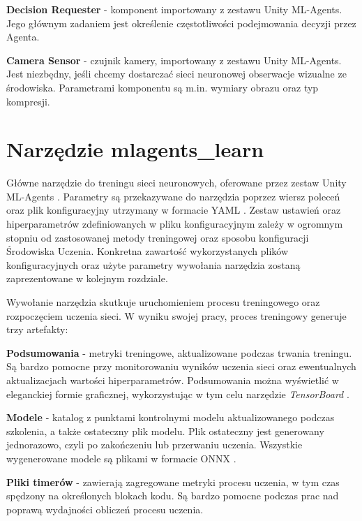 \begin{enumerate*}
\item \textbf{Decision Requester} - komponent importowany z zestawu Unity ML-Agents. Jego głównym zadaniem jest określenie częstotliwości podejmowania decyzji przez Agenta.
\item \textbf{Camera Sensor} - czujnik kamery, importowany z zestawu Unity ML-Agents. Jest niezbędny, jeśli chcemy dostarczać sieci neuronowej obserwacje wizualne ze środowiska. Parametrami komponentu są m.in. wymiary obrazu oraz typ kompresji.
\end{enumerate*}

\section{Narzędzie mlagents\_learn}
Główne narzędzie do treningu sieci neuronowych, oferowane przez zestaw Unity ML-Agents \cite{unitymla:trainingMlAgents}. Parametry są przekazywane do narzędzia poprzez wiersz poleceń oraz plik konfiguracyjny utrzymany w formacie YAML \cite{unitymla:configFile}. Zestaw ustawień oraz hiperparametrów zdefiniowanych w pliku konfiguracyjnym zależy w ogromnym stopniu od zastosowanej metody treningowej oraz sposobu konfiguracji Środowiska Uczenia. Konkretna zawartość wykorzystanych plików konfiguracyjnych oraz użyte parametry wywołania narzędzia zostaną zaprezentowane w kolejnym rozdziale.

Wywołanie narzędzia skutkuje uruchomieniem procesu treningowego oraz rozpoczęciem uczenia sieci. W wyniku swojej pracy, proces treningowy generuje trzy artefakty:
\begin{enumerate*}
\item \textbf{Podsumowania} - metryki treningowe, aktualizowane podczas trwania treningu. Są bardzo pomocne przy monitorowaniu wyników uczenia sieci oraz ewentualnych aktualizacjach wartości hiperparametrów. Podsumowania można wyświetlić w eleganckiej formie graficznej, wykorzystując w tym celu narzędzie \textit{TensorBoard} \cite{unitymla:tensorboard}.
\item \textbf{Modele} - katalog z punktami kontrolnymi modelu aktualizowanego podczas szkolenia, a także ostateczny plik modelu. Plik ostateczny jest generowany jednorazowo, czyli po zakończeniu lub przerwaniu uczenia. Wszystkie wygenerowane modele są plikami w formacie ONNX \cite{onnx:website}.
\item \textbf{Pliki timerów} - zawierają zagregowane metryki procesu uczenia, w tym czas spędzony na określonych blokach kodu. Są bardzo pomocne podczas prac nad poprawą wydajności obliczeń procesu uczenia.
\end{enumerate*}

